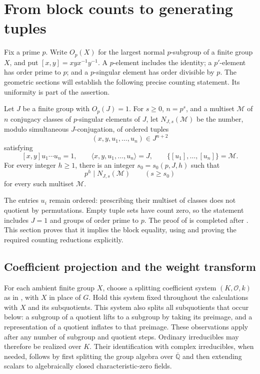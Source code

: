 \section{From block counts to generating tuples}\label{sec:group}

Fix a prime $p$. Write $O_p(X)$ for the largest normal $p$-subgroup
of a finite group $X$, and put $[x,y]=xyx^{-1}y^{-1}$. A
$p$-element includes the identity; a $p'$-element has order prime to
$p$; and a $p$-singular element has order divisible by $p$.
The geometric sections will establish the following precise counting
statement. Its uniformity is part of the assertion.

\begin{theorem}
\label{thm:tuple-divisibility}
Let $J$ be a finite group with $O_p(J)=1$. For $s\geq0$, $n=p^s$,
and a multiset
$\mathcal M$ of $n$ conjugacy classes of $p$-singular elements of $J$,
let $N_{J,s}(\mathcal M)$ be the number, modulo simultaneous
$J$-conjugation, of ordered tuples
\[
 (x,y,u_1,\ldots,u_n)\in J^{n+2}
\]
satisfying
\begin{equation}\label{eq:tuple-relation}
 [x,y]u_1\cdots u_n=1,\qquad
 \langle x,y,u_1,\ldots,u_n\rangle=J,
 \qquad \{[u_1],\ldots,[u_n]\}=\mathcal M.
\end{equation}
For every integer $h\geq1$, there is an integer $s_0=s_0(p,J,h)$
such that
\[
 p^h\mid N_{J,s}(\mathcal M)
 \qquad(s\geq s_0)
\]
for every such multiset $\mathcal M$.
\end{theorem}

The entries $u_i$ remain ordered: prescribing their multiset of classes
does not quotient by permutations. Empty tuple sets have count zero,
so the statement includes $J=1$ and groups of order prime to $p$.
The proof of  is completed after
. This section proves that it implies the
block equality, using 
and proving the required counting reductions explicitly.

\subsection{Coefficient projection and the weight transform}

For each ambient finite group $X$, choose a splitting coefficient system
$(K,\mathcal O,k)$ as in , with
$X$ in place of $G$. Hold this system fixed throughout the calculations
with $X$ and its subquotients.
This system also splits all subquotients that occur below: a subgroup of a
quotient lifts to a subgroup by taking its preimage, and a
representation of a quotient inflates to that preimage. These
observations apply after any number of subgroup and quotient steps.
Ordinary irreducibles may therefore be realized over $K$. Their
identification with complex irreducibles, when needed, follows by
first splitting the group algebra over $\overline{\mathbb Q}$ and
then extending scalars to algebraically closed characteristic-zero
fields.

